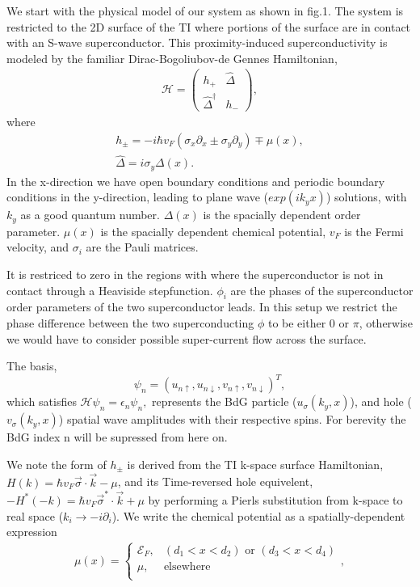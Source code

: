 \documentclass[11pt]{report}
\begin{document}
We start with the physical model of our system as shown in fig.1. The system is restricted to the 2D surface of the TI where portions of the surface are in contact with an S-wave superconductor.  This proximity-induced superconductivity is modeled by the familiar Dirac-Bogoliubov-de Gennes Hamiltonian,
\begin{eqnarray}
&\mathcal{H}=\left(
\begin{array}{cc}
h_{+}  &  \hat{\Delta} \\
\hat{\Delta}^\dagger  &   h_{-}
\end{array}\label{fkmodel}
\right),&
\end{eqnarray}
where
\begin{eqnarray}
&h_{\pm}= -i\hbar  v_F (\sigma_x\partial_x \pm \sigma_y \partial_y) \mp \mu(x),&\\
&\hat{\Delta}= i\sigma_y  \Delta(x).&
\end{eqnarray}
 In the x-direction we have open boundary conditions and periodic boundary conditions in the y-direction, leading to plane wave ($exp({i k_y x})$) solutions, with $k_y$ as a good quantum number. $\Delta(x)$ is the spacially dependent order parameter.  $\mu(x)$ is the spacially dependent chemical potential, $v_F$ is the Fermi velocity, and $\sigma_i$ are the Pauli matrices. 

It is restriced to zero in the regions with where the superconductor is not in contact through a Heaviside stepfunction. $\phi_i$ are the phases of the superconductor order parameters of the two superconductor leads. In this setup we restrict the phase difference between the two superconducting  $\phi$ to be either 0 or $\pi$, otherwise we would have to consider possible super-current flow across the surface.

The basis,
\begin{equation}
\psi_n=\left ( { u} _{n\uparrow},  { u}_{n\downarrow},  { v}_{n\uparrow}, { v}_{n\downarrow} \right )^T,
\end{equation} 
which satisfies $ \mathcal{H}\psi_n=\epsilon_n \psi_n, $ represents the BdG particle ($u_\sigma (k_y, x)$), and hole ($v_\sigma (k_y, x)$) spatial wave amplitudes with their respective spins. For berevity the BdG index n will be supressed from here on.

We note the form of $h_{\pm}$ is derived from the TI k-space surface Hamiltonian, $H(k)=\hbar v_F \vec{\sigma}\cdot\vec{k}-\mu$, and its Time-reversed hole equivelent, $-H^*(-k)=\hbar v_F\vec{\sigma}^{\ast}\cdot\vec{k}+\mu$ by performing a Pierls substitution from k-space to real space ($k_i\rightarrow -i \partial_i$). We write the chemical potential as a spatially-dependent expression 
\begin{eqnarray}
\mu(x)=\left\{
\begin{array}{cc}
\mathcal{E}_F,&(d_1<x<d_2) \text{ or } (d_3<x<d_4)\\
\mu,& \text{elsewhere}\\
\end{array} \right .,
\end{eqnarray}
\end{document}
